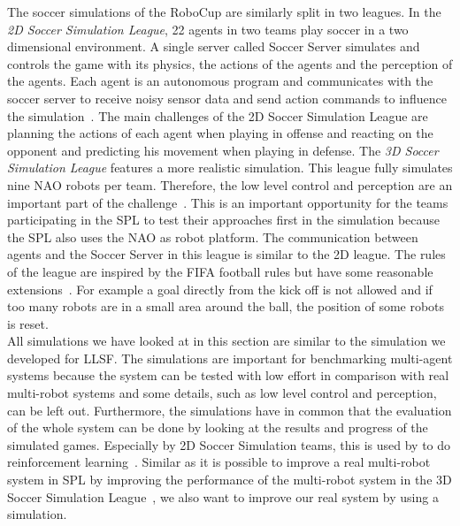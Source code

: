 The soccer simulations of the RoboCup are similarly split in two leagues. In the \textit{2D Soccer Simulation League}, 22 agents in two teams play soccer in a two dimensional environment. A single server called Soccer Server simulates and controls the game with its physics, the actions of the agents and the perception of the agents. Each agent is an autonomous program and communicates with the soccer server to receive noisy sensor data and send action commands to influence the simulation~\cite{soccer_simulation}. The main challenges of the 2D Soccer Simulation League are planning the actions of each agent when playing in offense and reacting on the opponent and predicting his movement when playing in defense. The \textit{3D Soccer Simulation League} features a more realistic simulation. This league fully simulates nine NAO robots per team. Therefore, the low level control and perception are an important part of the challenge~\cite{soccer_simulation_low_level}. This is an important opportunity for the teams participating in the SPL to test their approaches first in the simulation because the SPL also uses the NAO as robot platform. The communication between agents and the Soccer Server in this league is similar to the 2D league. The rules of the league are inspired by the FIFA football rules but have some reasonable extensions~\cite{soccer_rules_3d}. For example a goal directly from the kick off is not allowed and if too many robots are in a small area around the ball, the position of some robots is reset.\\
All simulations we have looked at in this section are similar to the simulation we developed for LLSF. The simulations are important for benchmarking multi-agent systems because the system can be tested with low effort in comparison with real multi-robot systems and some details, such as low level control and perception, can be left out.  Furthermore, the simulations have in common that the evaluation of the whole system can be done by looking at the results and progress of the simulated games. Especially by 2D Soccer Simulation teams, this is used by to do reinforcement learning~\cite{simsoccer_reinforcement_1,simsoccer_reinforcement_2}. Similar as it is possible to improve a real multi-robot system in SPL by improving the performance of the multi-robot system in the 3D Soccer Simulation League~\cite{from_sim_to_real}, we also want to improve our real system by using a simulation.


